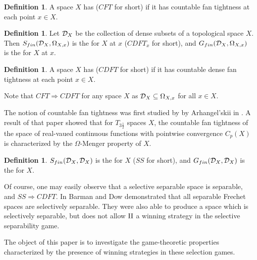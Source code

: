 \documentclass{amsart}
\theoremstyle{plain}
\theoremstyle{definition}
\newtheorem{definition}[theorem]{Definition}
\theoremstyle{remark}
\theoremstyle{plain}
\theoremstyle{definition}
\theoremstyle{remark}
\begin{document}
\begin{definition}
  A space \(X\) has  (\(CFT\) for short)
  if it has
  countable fan tightness at each point \(x\in X\).
\end{definition}

\begin{definition}
  Let \(\mathcal{D}_{X}\) be the collection of dense subsets of a topological
  space \(X\).
  Then \(S_{fin}(\mathcal{D}_X,\Omega_{X,x})\) is the
   for \(X\) at \(x\)
  (\(CDFT_x\) for short), and
  \(G_{fin}(\mathcal{D}_X,\Omega_{X,x})\) is the
   for \(X\) at \(x\).
\end{definition}

\begin{definition}
  A space \(X\) has 
  (\(CDFT\) for short) if it has
  countable dense fan tightness at each point \(x\in X\).
\end{definition}

Note that \(CFT\Rightarrow CDFT\) for any space \(X\) as
\(\mathcal{D}_X\subseteq \Omega_{X,x}\) for all \(x\in X\).

The notion of countable fan tightness was first studied by
by Arhangel'skii in \cite{MR837289}. A result of that paper showed
that for \(T_{3\frac{1}{2}}\) spaces \(X\), the countable fan tightness
of the space of real-vaued continuous functions with
pointwise convergence \(C_p(X)\) is characterized by
the \(\Omega\)-Menger property of \(X\).


\begin{definition}
  \(S_{fin}(\mathcal{D}_X,\mathcal{D}_X)\) is the
   for \(X\)
  (\(SS\) for short), and
  \(G_{fin}(\mathcal{D}_X,\mathcal{D}_X)\) is the
   for \(X\).
\end{definition}

Of course, one may easily observe that a selective separable space is
separable, and \(SS\Rightarrow CDFT\).
In \cite{MR2678950} Barman and Dow demonstrated that all
separable Frechet spaces are selectively separable. They were also able
to produce a space which is selectively separable, but does not allow
\(\mathrm{II}\) a winning strategy in the selective separability game.

The object of this paper is to investigate the game-theoretic properties
characterized by the presence of winning 
strategies in these selection games.
\end{document}
